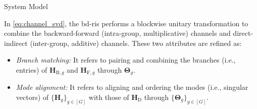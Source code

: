 \documentclass[journal]{IEEEtran}
\begin{document}
\begin{section}{System Model}
		\begin{remark}
			In \eqref{eq:channel_svd}, the \gls{bd}-\gls{ris} performs a blockwise unitary transformation to combine the backward-forward (intra-group, multiplicative) channels and direct-indirect (inter-group, additive) channels.
			These two attributes are refined as:
			\begin{itemize}
				\item \emph{Branch matching:} It refers to pairing and combining the branches (i.e., entries) of $\mathbf{H}_{\mathrm{B},g}$ and $\mathbf{H}_{\mathrm{F},g}$ through $\mathbf{\Theta}_g$.
				\item \emph{Mode alignment:} It refers to aligning and ordering the modes (i.e., singular vectors) of $\{\mathbf{H}_g\}_{g \in [G]}$ with those of $\mathbf{H}_\mathrm{D}$ through $\{\mathbf{\Theta}_g\}_{g \in [G]}$.
			\end{itemize}
		\end{remark}


\end{section}
\end{document}
